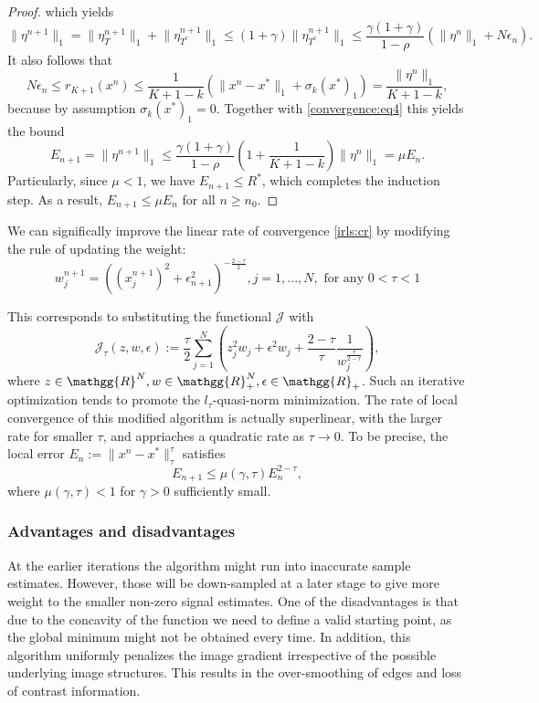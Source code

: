 \documentclass[
  english,        %
  font=times,     %
  onecolumn,      %
]{tumarticle}
\numberwithin{equation}{section} %
\begin{document}
\begin{large}
\begin{adjustwidth}{0pt}{0pt}
\begin{proof}
which yields
\begin{equation}
    \label{convergence:eq4}
    \lVert \eta^{n+1} \rVert_1 = \lVert \eta_T^{n+1} \rVert_1 + \lVert \eta_{T^c}^{n+1} \rVert_1 \leq (1+\gamma) \lVert \eta_{T^c}^{n+1} \rVert_1 \leq \frac{\gamma  (1+\gamma)}{1-\rho} (\lVert \eta^n \rVert_1 + N \epsilon_n).
\end{equation}
It also follows that
\[N \epsilon_n \leq r_{K+1} (x^n) \leq \frac{1}{K + 1 - k} (\lVert x^n - x^* \rVert_1 + \sigma_k (x^*)_1) = \frac{\lVert \eta^n \rVert_1}{K + 1 - k},\]
because by assumption $\sigma_k (x^*)_1 = 0$. Together with \ref{convergence:eq4} this yields the bound
\[E_{n+1} = \lVert \eta^{n+1} \rVert_1 \leq \frac{\gamma  (1+\gamma)}{1-\rho} (1 + \frac{1}{K + 1 - k}) \lVert \eta^n \rVert_1 = \mu E_n.\]
Particularly, since $\mu < 1$, we have $E_{n+1} \leq R^*$, which completes the induction step. As a result, $E_{n+1} \leq \mu E_n$ for all $n \geq n_0$.
\end{proof}

We can significally improve the linear rate of convergence \ref{irls:cr} by modifying the rule of updating the weight:
\[w_j^{n+1} = ((x_j^{n+1})^2 + \epsilon_{n+1}^2)^{-\frac{2-\tau}{2}}, j = 1,...,N, \text{ for any } 0 < \tau < 1\]

This corresponds to substituting the functional $\mathcal{J}$ with
\[\mathcal{J}_{\tau} (z, w, \epsilon) := \frac{\tau}{2} \sum_{j=1}^N (z_j^2 w_j + \epsilon^2 w_j + \frac{2-\tau}{\tau} \frac{1}{w_j^{\frac{\tau}{2-\tau}}}),\]
where $z \in \mathgg{R}^N, w \in \mathgg{R}^N_+, \epsilon \in \mathgg{R}_+$. Such an iterative optimization tends to promote the $l_\tau$-quasi-norm minimization. The rate of local convergence of this modified algorithm is actually superlinear, with the larger rate for smaller $\tau$, and appriaches a quadratic rate as $\tau \rightarrow 0$. To be precise, the local error $E_n := \lVert x^n - x^* \rVert_\tau^\tau$ satisfies
\[E_{n+1} \leq \mu (\gamma, \tau) E_n^{2-\tau},\]
where $\mu(\gamma, \tau) < 1$ for $\gamma > 0$ sufficiently small.

\subsubsection{Advantages and disadvantages}
At the earlier iterations the algorithm might run into inaccurate sample estimates. However, those will be down-sampled at a later stage to give more weight to the smaller non-zero signal estimates. One of the disadvantages is that due to the concavity of the function we need to define a valid starting point, as the global minimum might not be obtained every time. In addition, this algorithm uniformly penalizes the image gradient irrespective of the possible underlying image structures. This results in the over-smoothing of edges and loss of contrast information.


\end{adjustwidth}
\end{large}
\end{document}
